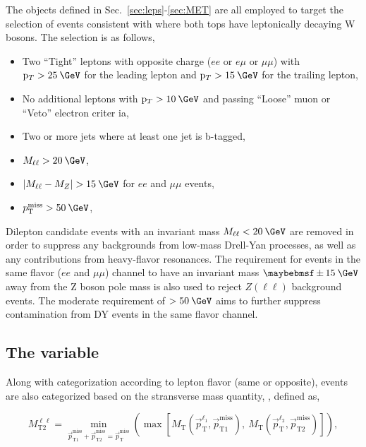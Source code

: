 The objects defined in Sec.~\ref{sec:leps}-\ref{sec:MET} are all employed to target the selection of events consistent with \ttMET where both tops have leptonically decaying W bosons. The selection is as follows,

\begin{itemize}
\item Two ``Tight'' leptons with opposite charge ($ee$ or $e\mu$ or $\mu\mu$) with $\pt>25\:\GeV$ for 
the leading lepton and $\pt>15\:\GeV$ for the trailing lepton,
\item No additional leptons with $\pt>10\:\GeV$ and passing ``Loose'' muon or ``Veto'' electron criter
ia,
\item Two or more jets where at least one jet is b-tagged,
\item $M_{\ell\ell}>20\:\GeV$,
\item $|M_{\ell\ell} - M_Z|>15\:\GeV$ for $ee$ and $\mu\mu$ events,
\item $\ptmiss>50\:\GeV$,
\end{itemize}

Dilepton candidate events with an invariant mass $M_{\ell\ell}<20\:\GeV$ are removed in order to suppress any backgrounds from low-mass Drell-Yan processes, as well as any contributions from heavy-flavor resonances. The requirement for events in the same flavor ($ee$ and $\mu\mu$) channel to have an invariant mass $\pm15\:\GeV$ away from the Z boson pole mass is also used to reject $Z(\ell\ell)$ background events. The moderate requirement of \ptmiss$>50\:\GeV$ aims to further suppress contamination from DY events in the same flavor channel.

\subsection{The \mttll variable}
\label{subsec:mt2ll}

Along with categorization according to lepton flavor (same or opposite), events are also categorized based on the stransverse mass quantity, \mttll, defined as,

\begin{equation}
  M_{\text{T2}}^{\ell\ell} = \min_{\vec{p}^{\text{miss}}_{\text{T1}}+\vec{p}^{\text{miss}}_{\text{T2}}=\vec{p}^{\text{miss}}_{\text{T}}}\left(\max\left[M_{\text{T}}\left(\vec{p}^{\ell_1}_{\text{T}},\vec{p}^{\text{miss}}_{\text{T1}}\right),\:M_{\text{T}}\left(\vec{p}^{\ell_2}_{\text{T}},\vec{p}^{\text{miss}}_{\text{T2}}\right)\right]\right),
  \label{eq:mt2ll}
\end{equation}

